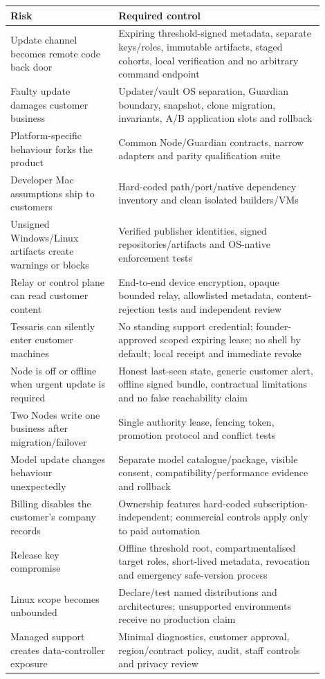 \documentclass[11pt]{article}
\begin{document}
\begin{longtable}{p{0.31\linewidth} p{0.59\linewidth}}
\toprule
Risk & Required control \\
\midrule
Update channel becomes remote code back door & Expiring threshold-signed metadata, separate keys/roles, immutable artifacts, staged cohorts, local verification and no arbitrary command endpoint \\
Faulty update damages customer business & Updater/vault OS separation, Guardian boundary, snapshot, clone migration, invariants, A/B application slots and rollback \\
Platform-specific behaviour forks the product & Common Node/Guardian contracts, narrow adapters and parity qualification suite \\
Developer Mac assumptions ship to customers & Hard-coded path/port/native dependency inventory and clean isolated builders/VMs \\
Unsigned Windows/Linux artifacts create warnings or blocks & Verified publisher identities, signed repositories/artifacts and OS-native enforcement tests \\
Relay or control plane can read customer content & End-to-end device encryption, opaque bounded relay, allowlisted metadata, content-rejection tests and independent review \\
Tessaris can silently enter customer machines & No standing support credential; founder-approved scoped expiring lease; no shell by default; local receipt and immediate revoke \\
Node is off or offline when urgent update is required & Honest last-seen state, generic customer alert, offline signed bundle, contractual limitations and no false reachability claim \\
Two Nodes write one business after migration/failover & Single authority lease, fencing token, promotion protocol and conflict tests \\
Model update changes behaviour unexpectedly & Separate model catalogue/package, visible consent, compatibility/performance evidence and rollback \\
Billing disables the customer's company records & Ownership features hard-coded subscription-independent; commercial controls apply only to paid automation \\
Release key compromise & Offline threshold root, compartmentalised target roles, short-lived metadata, revocation and emergency safe-version process \\
Linux scope becomes unbounded & Declare/test named distributions and architectures; unsupported environments receive no production claim \\
Managed support creates data-controller exposure & Minimal diagnostics, customer approval, region/contract policy, audit, staff controls and privacy review \\
\bottomrule
\end{longtable}
\end{document}
